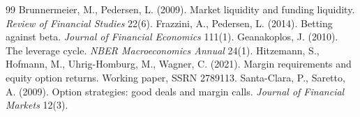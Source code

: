 \documentclass[11pt]{article}
\begin{document}
\begin{thebibliography}{99}\small
{} Brunnermeier, M., Pedersen, L. (2009). Market
liquidity and funding liquidity. \emph{Review of Financial Studies} 22(6).
 Frazzini, A., Pedersen, L. (2014). Betting against
beta. \emph{Journal of Financial Economics} 111(1).
 Geanakoplos, J. (2010). The leverage cycle. \emph{NBER
Macroeconomics Annual} 24(1).
 Hitzemann, S., Hofmann, M., Uhrig-Homburg, M., Wagner,
C. (2021). Margin requirements and equity option returns. Working paper, SSRN 2789113.
 Santa-Clara, P., Saretto, A. (2009). Option
strategies: good deals and margin calls. \emph{Journal of Financial Markets} 12(3).

\end{thebibliography}
\end{document}
